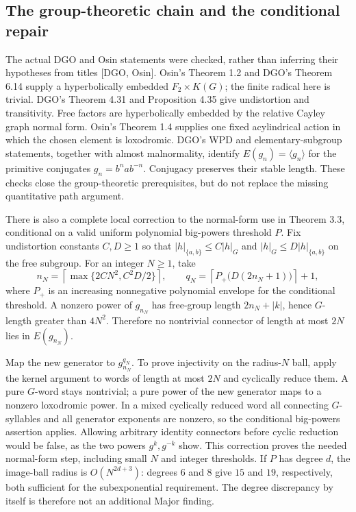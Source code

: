 \documentclass[10pt]{article}
\begin{document}
\subsection*{The group-theoretic chain and the conditional repair}
The actual DGO and Osin statements were checked, rather than inferring their hypotheses from titles [DGO, Osin]. Osin’s Theorem 1.2 and DGO’s Theorem 6.14 supply a hyperbolically embedded \(F_2\times K(G)\); the finite radical here is trivial. DGO’s Theorem 4.31 and Proposition 4.35 give undistortion and transitivity. Free factors are hyperbolically embedded by the relative Cayley graph normal form. Osin’s Theorem 1.4 supplies one fixed acylindrical action in which the chosen element is loxodromic. DGO’s WPD and elementary-subgroup statements, together with almost malnormality, identify \(E(g_n)=\langle g_n\rangle\) for the primitive conjugates \(g_n=b^nab^{-n}\). Conjugacy preserves their stable length. These checks close the group-theoretic prerequisites, but do not replace the missing quantitative path argument.\par
There is also a complete local correction to the normal-form use in Theorem 3.3, conditional on a valid uniform polynomial big-powers threshold \(P\). Fix undistortion constants \(C,D\ge1\) so that \(|h|_{\{a,b\}}\le C|h|_G\) and \(|h|_G\le D|h|_{\{a,b\}}\) on the free subgroup. For an integer \(N\ge1\), take \[n_N=\left\lceil\max\{2CN^2,C^2D/2\}\right\rceil,\qquad
 q_N=\left\lceil P_+\bigl(D(2n_N+1)\bigr)\right\rceil+1 ,\] where \(P_+\) is an increasing nonnegative polynomial envelope for the conditional threshold. A nonzero power of \(g_{n_N}\) has free-group length \(2n_N+|k|\), hence \(G\)-length greater than \(4N^2\). Therefore no nontrivial connector of length at most \(2N\) lies in \(E(g_{n_N})\).\par
Map the new generator to \(g_{n_N}^{q_N}\). To prove injectivity on the radius-\(N\) ball, apply the kernel argument to words of length at most \(2N\) and cyclically reduce them. A pure \(G\)-word stays nontrivial; a pure power of the new generator maps to a nonzero loxodromic power. In a mixed cyclically reduced word all connecting \(G\)-syllables and all generator exponents are nonzero, so the conditional big-powers assertion applies. Allowing arbitrary identity connectors before cyclic reduction would be false, as the two powers \(g^k,g^{-k}\) show. This correction proves the needed normal-form step, including small \(N\) and integer thresholds. If \(P\) has degree \(d\), the image-ball radius is \(O(N^{2d+3})\): degrees \(6\) and \(8\) give \(15\) and \(19\), respectively, both sufficient for the subexponential requirement. The degree discrepancy by itself is therefore not an additional Major finding.\par
\end{document}
